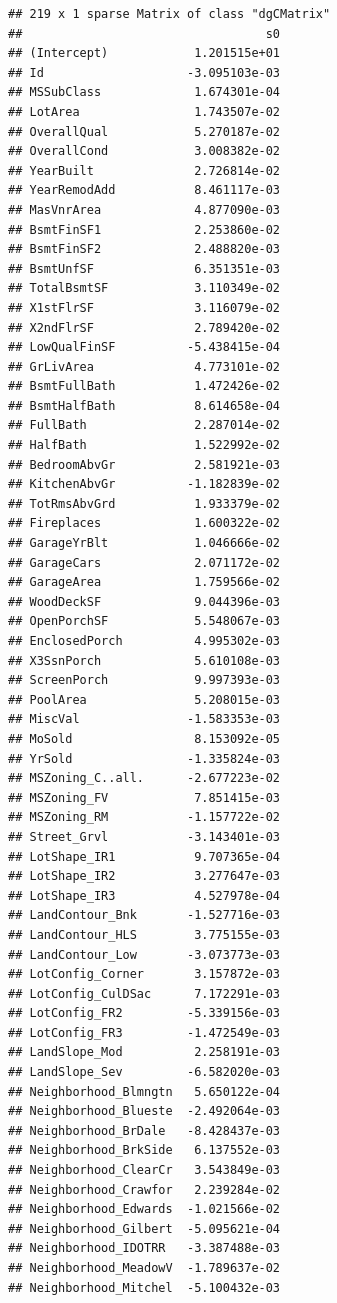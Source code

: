 \documentclass[
]{article}
\begin{document}
\begin{verbatim}
## 219 x 1 sparse Matrix of class "dgCMatrix"
##                                  s0
## (Intercept)            1.201515e+01
## Id                    -3.095103e-03
## MSSubClass             1.674301e-04
## LotArea                1.743507e-02
## OverallQual            5.270187e-02
## OverallCond            3.008382e-02
## YearBuilt              2.726814e-02
## YearRemodAdd           8.461117e-03
## MasVnrArea             4.877090e-03
## BsmtFinSF1             2.253860e-02
## BsmtFinSF2             2.488820e-03
## BsmtUnfSF              6.351351e-03
## TotalBsmtSF            3.110349e-02
## X1stFlrSF              3.116079e-02
## X2ndFlrSF              2.789420e-02
## LowQualFinSF          -5.438415e-04
## GrLivArea              4.773101e-02
## BsmtFullBath           1.472426e-02
## BsmtHalfBath           8.614658e-04
## FullBath               2.287014e-02
## HalfBath               1.522992e-02
## BedroomAbvGr           2.581921e-03
## KitchenAbvGr          -1.182839e-02
## TotRmsAbvGrd           1.933379e-02
## Fireplaces             1.600322e-02
## GarageYrBlt            1.046666e-02
## GarageCars             2.071172e-02
## GarageArea             1.759566e-02
## WoodDeckSF             9.044396e-03
## OpenPorchSF            5.548067e-03
## EnclosedPorch          4.995302e-03
## X3SsnPorch             5.610108e-03
## ScreenPorch            9.997393e-03
## PoolArea               5.208015e-03
## MiscVal               -1.583353e-03
## MoSold                 8.153092e-05
## YrSold                -1.335824e-03
## MSZoning_C..all.      -2.677223e-02
## MSZoning_FV            7.851415e-03
## MSZoning_RM           -1.157722e-02
## Street_Grvl           -3.143401e-03
## LotShape_IR1           9.707365e-04
## LotShape_IR2           3.277647e-03
## LotShape_IR3           4.527978e-04
## LandContour_Bnk       -1.527716e-03
## LandContour_HLS        3.775155e-03
## LandContour_Low       -3.073773e-03
## LotConfig_Corner       3.157872e-03
## LotConfig_CulDSac      7.172291e-03
## LotConfig_FR2         -5.339156e-03
## LotConfig_FR3         -1.472549e-03
## LandSlope_Mod          2.258191e-03
## LandSlope_Sev         -6.582020e-03
## Neighborhood_Blmngtn   5.650122e-04
## Neighborhood_Blueste  -2.492064e-03
## Neighborhood_BrDale   -8.428437e-03
## Neighborhood_BrkSide   6.137552e-03
## Neighborhood_ClearCr   3.543849e-03
## Neighborhood_Crawfor   2.239284e-02
## Neighborhood_Edwards  -1.021566e-02
## Neighborhood_Gilbert  -5.095621e-04
## Neighborhood_IDOTRR   -3.387488e-03
## Neighborhood_MeadowV  -1.789637e-02
## Neighborhood_Mitchel  -5.100432e-03

\end{verbatim}
\end{document}
